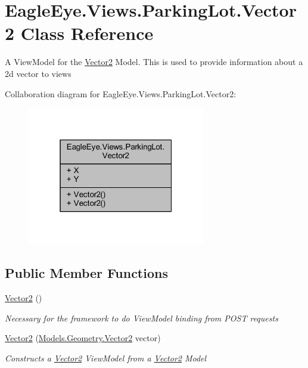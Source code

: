 \hypertarget{class_eagle_eye_1_1_views_1_1_parking_lot_1_1_vector2}{}\section{Eagle\+Eye.\+Views.\+Parking\+Lot.\+Vector2 Class Reference}
\label{class_eagle_eye_1_1_views_1_1_parking_lot_1_1_vector2}


A View\+Model for the \mbox{\hyperlink{class_eagle_eye_1_1_views_1_1_parking_lot_1_1_vector2}{Vector2}} Model. This is used to provide information about a 2d vector to views  




Collaboration diagram for Eagle\+Eye.\+Views.\+Parking\+Lot.\+Vector2\+:
\nopagebreak
\begin{figure}[H]
\begin{center}
\leavevmode
\includegraphics[width=220pt]{class_eagle_eye_1_1_views_1_1_parking_lot_1_1_vector2__coll__graph}
\end{center}
\end{figure}
\subsection*{Public Member Functions}
\begin{DoxyCompactItemize}
\item 
\mbox{\hyperlink{class_eagle_eye_1_1_views_1_1_parking_lot_1_1_vector2_a7ad4985eae411d4785f7da5964fafa8c}{Vector2}} ()
\begin{DoxyCompactList}\small\item\em Necessary for the framework to do View\+Model binding from P\+O\+ST requests \end{DoxyCompactList}\item 
\mbox{\hyperlink{class_eagle_eye_1_1_views_1_1_parking_lot_1_1_vector2_a09d06dd70916e05a76b0da35718ba02c}{Vector2}} (\mbox{\hyperlink{struct_eagle_eye_1_1_models_1_1_geometry_1_1_vector2}{Models.\+Geometry.\+Vector2}} vector)
\begin{DoxyCompactList}\small\item\em Constructs a \mbox{\hyperlink{class_eagle_eye_1_1_views_1_1_parking_lot_1_1_vector2}{Vector2}} View\+Model from a \mbox{\hyperlink{class_eagle_eye_1_1_views_1_1_parking_lot_1_1_vector2}{Vector2}} Model \end{DoxyCompactList}\end{DoxyCompactItemize}
